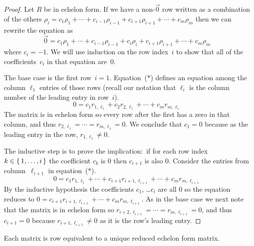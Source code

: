 \begin{proof}
Let $R$ be in echelon form.
If we have a non-\( \vec{0} \) row written as a combination
of the others
$\rho_i=c_1\rho_1+\cdots+c_{i-1}\rho_{i-1}+
               c_{i+1}\rho_{i+1}+\cdots+c_m\rho_m$
then we can rewrite the equation as
\begin{equation*}
   \vec{0}=c_1\rho_1+\cdots+c_{i-1}\rho_{i-1}+c_i\rho_i+
               c_{i+1}\rho_{i+1}+\cdots+c_m\rho_m
  \tag{$*$}
\end{equation*}
where $c_i=-1$.
We will use induction on the row index~$i$
to show that all of the coefficients~$c_i$ in that equation are~$0$.

The base case is the first row~$i=1$.
Equation~($*$) defines an equation among the column $\ell_1$ entries of those 
rows
(recall our notation that $\ell_i$ is the column number of 
the leading entry in row~$i$).
\begin{equation*}
  0=c_1r_{1,\ell_1}+c_2r_{2,\ell_1}+\cdots+c_mr_{m,\ell_1}
\end{equation*}
The matrix is in echelon form so
every row after the first has a zero in that column, and thus  
$r_{2,\ell_1}=\cdots=r_{m,\ell_1}=0$.
We conclude that $c_1=0$ because as the leading entry
in the row, $r_{1,\ell_1}\neq 0$.

The inductive step is to prove the implication:~if 
for each row index $k\in\mbox{$\{\,1,\ldots,i\,\}$}$ the coefficient $c_k$ is $0$
then $c_{i+1}$ is also $0$. 
Consider the entries from column~$\ell_{i+1}$ in equation~($*$). 
\begin{equation*}
  0=c_1r_{1,\ell_1}+\cdots+c_{i+1}r_{i+1,\ell_{i+1}}+\cdots+c_mr_{m,\ell_{i+1}}
\end{equation*}
By the inductive hypothesis the coefficients $c_1$, \ldots $c_i$ are
all $0$ so the equation reduces to 
$0=c_{i+1}r_{i+1,\ell_{i+1}}+\cdots+c_mr_{m,\ell_{i+1}}$.
As in the base case we next note that the matrix is in echelon form
so $r_{i+2,\ell_{i+1}}=\cdots=r_{m,\ell_{i+1}}=0$, and 
thus $c_{i+1}=0$ because $r_{i+1,\ell_{i+1}}\neq 0$ as it is the row's leading entry.
\end{proof}

\begin{theorem}
\label{th:ReducedEchelonFormIsUnique}
Each matrix is row equivalent to a unique reduced echelon form matrix.
\end{theorem}


